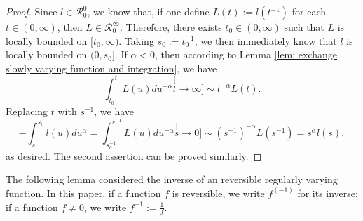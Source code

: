 \documentclass[12pt, a4paper]{amsart}
\theoremstyle{definition}
\numberwithin{equation}{section}
\begin{document}
\begin{proof}
	Since $l \in \mathcal R^0_0$, we know that, if one define $L(t):=l(t^{-1})$ for each $t\in (0,\infty)$, then $ L \in \mathcal R^\infty_0$.
	Therefore, there exists $t_0\in (0,\infty)$ such that $L$ is locally bounded on $[t_0,\infty)$.
	Taking $s_0:= t_0^{-1}$, we then immediately know that $l$ is locally bounded on $(0,s_0]$.
	If $\alpha<0 $, then according to Lemma \ref{lem: exchange slowly varying function and integration}, we have
\[
	\int_{t_0}^t L(u)du^{-\alpha}
	\stackrel[t\to \infty]{}{\sim} t^{-\alpha}  L(t).
\]
	Replacing $t$ with $s^{-1}$, we have
\[
	-\int_{s}^{s_0} l(u)du^{\alpha}
	=\int_{s_0^{-1}}^{s^{-1}} L(u)du^{-\alpha}
	\stackrel[s\to 0]{}{\sim}  (s^{-1})^{-\alpha}L(s^{-1})
	=s^\alpha l(s),
\]
	as desired.
	The second assertion can be proved similarly.
\end{proof}

	The following lemma considered the inverse of an 
	reversible
	regularly varying function.
	In this paper, if a function $f$ is reversible, we write $f^{(-1)}$ for its inverse; if a function $f\neq 0$, we write $f^{-1} := \frac{1}{f} $.
\end{document}
